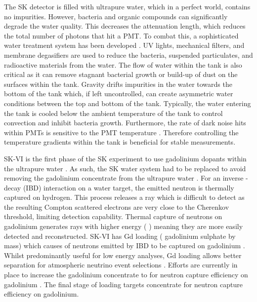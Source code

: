 The SK detector is filled with ultrapure water, which in a perfect world, contains no impurities. However, bacteria and organic compounds can significantly degrade the water quality. This decreases the attenuation length, which reduces the total number of photons that hit a PMT. To combat this, a sophisticated water treatment system has been developed \cite{Fukuda2003-ly, Nakano2020-sb}. UV lights, mechanical filters, and membrane degasifiers are used to reduce the bacteria, suspended particulates, and radioactive materials from the water. The flow of water within the tank is also critical as it can remove stagnant bacterial growth or build-up of dust on the surfaces within the tank. Gravity drifts impurities in the water towards the bottom of the tank which, if left uncontrolled, can create asymmetric water conditions between the top and bottom of the tank.
Typically, the water entering the tank is cooled below the ambient temperature of the tank to control convection and inhibit bacteria growth. Furthermore, the rate of dark noise hits within PMTs is sensitive to the PMT temperature \cite{HamamatsuPMT}. Therefore controlling the temperature gradients within the tank is beneficial for stable measurements.

SK-VI is the first phase of the SK experiment to use gadolinium dopants within the ultrapure water \cite{10.5281/zenodo.6694761}. As such, the SK water system had to be replaced to avoid removing the gadolinium concentrate from the ultrapure water \cite{Abe2022-qq}. For an inverse \quickmath{\beta}-decay (IBD) interaction on a water target, the emitted neutron is thermally captured on hydrogen. This process releases a  \quickmath{\gamma} ray which is difficult to detect as the resulting Compton scattered electrons are very close to the Cherenkov threshold, limiting detection capability. Thermal capture of neutrons on gadolinium generates \quickmath{\gamma} rays with higher energy ( \cite{Abe2022-ij}) meaning they are more easily detected and reconstructed. SK-VI has  Gd loading ( gadolinium sulphate by mass) which causes  of neutrons emitted by IBD to be captured on gadolinium\cite{PhysRevLett.93.171101,Marti2020-le} . Whilst predominantly useful for low energy analyses, Gd loading allows better \quickmath{\nu/\bar{\nu}} separation for atmospheric neutrino event selections \cite{Marti2019-gu}. Efforts are currently in place to increase the gadolinium concentrate to  for  neutron capture efficiency on gadolinium \cite{Vagins2022-sj}. The final stage of loading targets  concentrate for  neutron capture efficiency on gadolinium.

